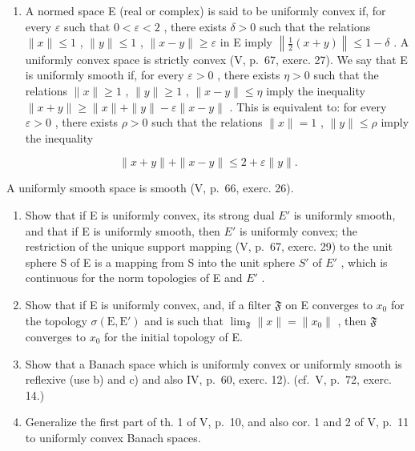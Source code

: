 \begin{enumerate}
\def\labelenumi{\arabic{enumi})}
\setcounter{enumi}{30}
\tightlist
\item
  A normed space E (real or complex) is said to be uniformly convex if, for every \(\varepsilon\) such that \(0 < \varepsilon < 2\) , there exists \(\delta > 0\) such that the relations \(\|x\| \leqslant 1\) , \(\|y\| \leqslant 1\) , \(\|x - y\| \geqslant \varepsilon\) in E imply \(\left\|\frac{1}{2}(x + y)\right\| \leqslant 1 - \delta\) . A uniformly convex space is strictly convex (V, p.~67, exerc. 27). We say that E is uniformly smooth if, for every \(\varepsilon > 0\) , there exists \(\eta > 0\) such that the relations \(\|x\| \geqslant 1\) , \(\|y\| \geqslant 1\) , \(\|x - y\| \leqslant \eta\) imply the inequality \(\|x + y\| \geqslant \|x\| + \|y\| - \varepsilon \|x - y\|\) . This is equivalent to: for every \(\varepsilon > 0\) , there exists \(\rho > 0\) such that the relations \(\|x\| = 1\) , \(\|y\| \leqslant \rho\) imply the inequality
\end{enumerate}

\[
\| x + y \| + \| x - y \| \leqslant 2 + \varepsilon \| y \|.
\]

A uniformly smooth space is smooth (V, p.~66, exerc. 26).

\begin{enumerate}
\def\labelenumi{\alph{enumi})}
\item
  Show that if E is uniformly convex, its strong dual \(E'\) is uniformly smooth, and that if E is uniformly smooth, then \(E'\) is uniformly convex; the restriction of the unique support mapping (V, p.~67, exerc. 29) to the unit sphere S of E is a mapping from S into the unit sphere \(S'\) of \(E'\) , which is continuous for the norm topologies of E and \(E'\) .
\item
  Show that if E is uniformly convex, and, if a filter \(\mathfrak{F}\) on E converges to \(x_{0}\) for the topology \(\sigma(\mathrm{E}, \mathrm{E}')\) and is such that \(\lim_{\mathfrak{F}} \|x\| = \|x_{0}\|\) , then \(\mathfrak{F}\) converges to \(x_{0}\) for the initial topology of E.
\item
  Show that a Banach space which is uniformly convex or uniformly smooth is reflexive (use b) and c) and also IV, p.~60, exerc. 12). (cf.~V, p.~72, exerc. 14.)
\item
  Generalize the first part of th. 1 of V, p.~10, and also cor. 1 and 2 of V, p.~11 to uniformly convex Banach spaces.
\end{enumerate}

